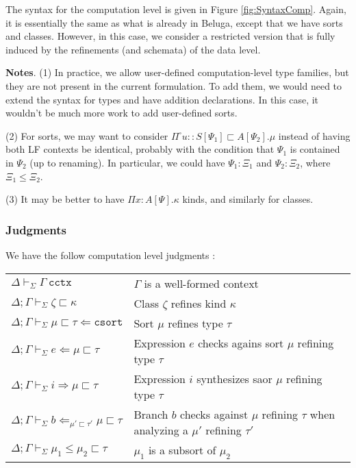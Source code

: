 \documentclass[letterpaper, 11pt]{article}
\newcommand{\Rar}{\Rightarrow}
\newcommand{\Lar}{\Leftarrow}
\newcommand{\csort}{\texttt{csort}}
\newcommand{\cctx}{\texttt{cctx}}
\begin{document}
    The syntax for the computation level is given in Figure \ref{fig:SyntaxComp}.  Again, it is essentially the same as what is already in Beluga, except
    that we have sorts and classes.  However, in this case, we consider a restricted version that is fully induced by the refinements (and schemata) of
    the data level.

    \textbf{Notes}. (1) In practice, we allow user-defined computation-level type families, but they are not present in the current formulation.  To add
    them, we would need to extend the syntax for types and have addition declarations.  In this case, it wouldn't be much more work to add user-defined
    sorts.

    (2) For sorts, we may want to consider $\Pi^\square u{::}S[\Psi_1] \sqsubset A[\Psi_2]. \mu$ instead of having both LF contexts be identical, probably
    with the condition that $\Psi_1$ is contained in $\Psi_2$ (up to renaming).  In particular, we could have $\Psi_1 {:} \Xi_1$ and $\Psi_2 {:} \Xi_2$,
    where $\Xi_1 \leq \Xi_2$.

    (3) It may be better to have $\Pi x{:}A[\Psi].\kappa$ kinds, and similarly for classes.

    \subsubsection{Judgments}
    We have the follow computation level judgments :

    \begin{tabular}{ll}
      $ \Delta \vdash_\Sigma \Gamma \ \cctx$                                         & $\Gamma$ is a well-formed context \\
      $ \Delta; \Gamma \vdash_\Sigma \zeta \sqsubset \kappa$                       & Class $\zeta$ refines kind $\kappa$ \\
      $ \Delta; \Gamma \vdash_\Sigma \mu \sqsubset \tau \Lar \csort$               & Sort $\mu$ refines type $\tau$ \\
      $ \Delta; \Gamma \vdash_\Sigma e \Lar \mu \sqsubset \tau$                    & Expression $e$ checks agains sort $\mu$ refining type $\tau$ \\
      $ \Delta; \Gamma \vdash_\Sigma i \Rar \mu \sqsubset \tau$                    & Expression $i$ synthesizes saor $\mu$ refining type $\tau$ \\
      $ \Delta; \Gamma \vdash_\Sigma b \Lar_{\mu' \sqsubset \tau'} \mu \sqsubset \tau$ & Branch $b$ checks against $\mu$ refining $\tau$ 
                                                                                           when analyzing a $\mu'$ refining $\tau'$ \\
      $ \Delta; \Gamma \vdash_\Sigma \mu_1 \leq \mu_2 \sqsubset \tau$              & $\mu_1$ is a subsort of $\mu_2$ 
    \end{tabular}
\end{document}
